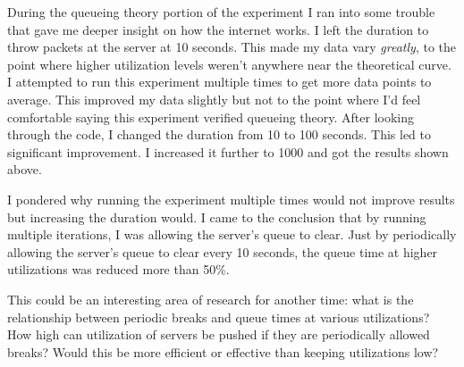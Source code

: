 \documentclass[11pt]{article}
\begin{document}
During the queueing theory portion of the experiment I ran into some trouble that gave me deeper insight on how the internet works. I left the duration to throw packets at the server at 10 seconds. This made my data vary \emph{greatly}, to the point where higher utilization levels weren't anywhere near the theoretical curve. I attempted to run this experiment multiple times to get more data points to average. This improved my data slightly but not to the point where I'd feel comfortable saying this experiment verified queueing theory. After looking through the code, I changed the duration from 10 to 100 seconds. This led to significant improvement. I increased it further to 1000 and got the results shown above. 

I pondered why running the experiment multiple times would not improve results but increasing the duration would. I came to the conclusion that by running multiple iterations, I was allowing the server's queue to clear. Just by periodically allowing the server's queue to clear every 10 seconds, the queue time at higher utilizations was reduced more than 50\%.

This could be an interesting area of research for another time: what is the relationship between periodic breaks and queue times at various utilizations? How high can utilization of servers be pushed if they are periodically allowed breaks? Would this be more efficient or effective than keeping utilizations low?
\end{document}
